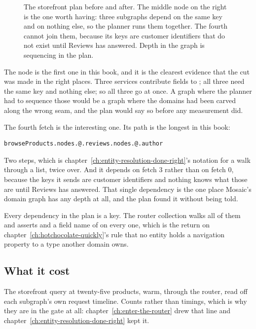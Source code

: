 \begin{figure}[htbp]
  \centering
  
  \caption{The storefront plan before and after. The middle node on the right is
  the one worth having: three subgraphs depend on the same key and on nothing
  else, so the planner runs them together. The fourth cannot join them, because
  its keys are customer identifiers that do not exist until Reviews has
  answered. Depth in the graph is sequencing in the plan.}
  \label{fig:ch12-query-plan}
\end{figure}

%
The  node is the first one in this book, and it is the clearest
evidence that the cut was made in the right places. Three services contribute
fields to ; all three need the same key and nothing else; so all
three go at once. A graph where the planner had to sequence those would be a
graph where the domains had been carved along the wrong seam, and the plan would
say so before any measurement did.

%
The fourth fetch is the interesting one. Its path is the longest in this book:

\begin{verbatim}
browseProducts.nodes.@.reviews.nodes.@.author
\end{verbatim}

Two  steps, which is chapter~\ref{ch:entity-resolution-done-right}'s
notation for a walk through a list, twice over. And it depends on fetch 3 rather
than on fetch 0, because the keys it sends are customer identifiers and nothing
knows what those are until Reviews has answered. That single dependency is the
one place Mosaic's domain graph has any depth at all, and the plan found it
without being told.

Every dependency in the plan is a key. The router collection walks all of them
and asserts  and a field name of  on every one, which is
the return on chapter~\ref{ch:hotchocolate-quickly}'s rule that no entity holds
a navigation property to a type another domain owns.

\subsection*{What it cost}

%
The storefront query at twenty-five products, warm, through the router, read off
each subgraph's own request timeline. Counts rather than timings, which is why
they are in the gate at all: chapter~\ref{ch:enter-the-router} drew that line
and chapter~\ref{ch:entity-resolution-done-right} kept it.

